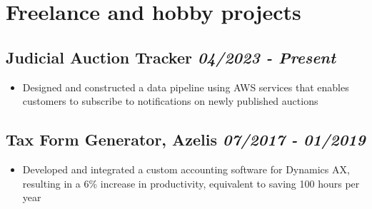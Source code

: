 \documentclass[a4paper]{article}
\newcommand{\bolditalicpair}
[2]
{\textbf{#1} \texorpdfstring{\hfill}{} \textit{#2}}
\begin{document}




\section{Freelance and hobby projects}
\subsection{\bolditalicpair{Judicial Auction Tracker}{04/2023 - Present}}

\begin{itemize}
  \item Designed and constructed a data pipeline using AWS services that enables customers to subscribe to notifications on newly published auctions
\end{itemize}

\subsection{\bolditalicpair{Tax Form Generator, Azelis}{07/2017 - 01/2019}}

\begin{itemize}
  \item Developed and integrated a custom accounting software for Dynamics AX, resulting in a 6\% increase in productivity, equivalent to saving 100 hours per year
\end{itemize}



\end{document}
